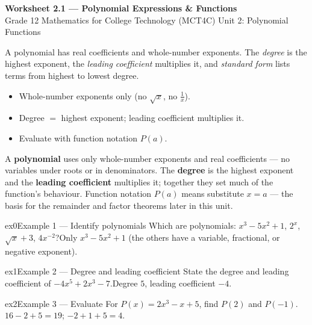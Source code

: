 \documentclass[11pt]{article}
\begin{document}
\begin{center}
{\LARGE\bfseries\color{titleblue}Worksheet 2.1 --- Polynomial Expressions \& Functions}\\[2pt]
{\small Grade 12 Mathematics for College Technology (MCT4C) \textperiodcentered{} Unit 2: Polynomial Functions}
\end{center}

\begin{ideabox}
A polynomial has real coefficients and whole-number exponents. The \emph{degree} is the highest exponent, the \emph{leading coefficient} multiplies it, and \emph{standard form} lists terms from highest to lowest degree.
\begin{itemize}[leftmargin=*,itemsep=2pt]
  \item Whole-number exponents only (no $\sqrt{x}$, no $\tfrac1x$).
  \item Degree $=$ highest exponent; leading coefficient multiplies it.
  \item Evaluate with function notation $P(a)$.
\end{itemize}
\end{ideabox}

\begin{learnbox}
A \textbf{polynomial} uses only whole-number exponents and real coefficients — no variables under roots or in denominators.
The \textbf{degree} is the highest exponent and the \textbf{leading coefficient} multiplies it; together they set much of the function's behaviour.
Function notation $P(a)$ means substitute $x=a$ — the basis for the remainder and factor theorems later in this unit.
\end{learnbox}


\begin{example}{ex0}{Example 1 --- Identify polynomials}
Which are polynomials: $x^3-5x^2+1$, $2^{x}$, $\sqrt{x}+3$, $4x^{-2}$?\soln Only $x^3-5x^2+1$ (the others have a variable, fractional, or negative exponent).
\end{example}

\begin{example}{ex1}{Example 2 --- Degree and leading coefficient}
State the degree and leading coefficient of $-4x^5+2x^3-7$.\soln Degree $5$, leading coefficient $-4$.
\end{example}

\begin{example}{ex2}{Example 3 --- Evaluate}
For $P(x)=2x^3-x+5$, find $P(2)$ and $P(-1)$.\soln $16-2+5=19$; $-2+1+5=4$.
\end{example}
\end{document}
